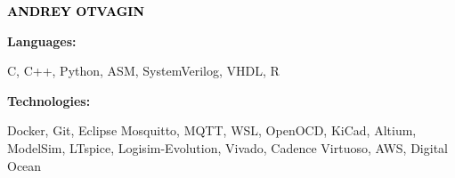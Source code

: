 \documentclass[9pt]{developercv} %
\begin{document}

\begin{minipage}[t]{0.5\textwidth} 
	\vspace{-\baselineskip} %
	
	{ \fontsize{16}{20} \textcolor{black}{\textbf{\MakeUppercase{Andrey Otvagin}}}} %
	
	\vspace{6pt}
    \hspace{12pt}

    \hspace{12pt}
    
    \hspace{12pt}

    
\end{minipage}
\hfill
\begin{minipage}[t]{0.5\textwidth}
    \vspace{-18pt}
    \vspace{-6pt}
    
    \begin{minipage}[t]{0.2\textwidth}
        \textbf{Languages:}
    \end{minipage}
    \hfill
    \begin{minipage}[t]{0.73\textwidth}
        C, C++, Python, ASM, SystemVerilog, VHDL, R
    \end{minipage}
    \vspace{4mm}
    
    \begin{minipage}[t]{0.2\textwidth}
        \textbf{Technologies:}
    \end{minipage}
    \hfill
    \begin{minipage}[t]{0.73\textwidth}
        Docker, Git, Eclipse Mosquitto, MQTT, WSL, OpenOCD, KiCad, Altium, ModelSim, LTspice, Logisim-Evolution, Vivado, Cadence Virtuoso, AWS, Digital Ocean
    \end{minipage}
    
\end{minipage}
\end{document}
